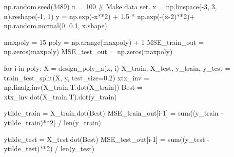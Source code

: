 \documentclass[
  letterpaper,
  DIV=11,
  numbers=noendperiod]{scrartcl}
\newenvironment{Shaded}{\begin{snugshade}}{\end{snugshade}}
\newcommand{\BuiltInTok}[1]{\textcolor[rgb]{0.00,0.23,0.31}{#1}}
\newcommand{\CommentTok}[1]{\textcolor[rgb]{0.37,0.37,0.37}{#1}}
\newcommand{\ControlFlowTok}[1]{\textcolor[rgb]{0.00,0.23,0.31}{#1}}
\newcommand{\DecValTok}[1]{\textcolor[rgb]{0.68,0.00,0.00}{#1}}
\newcommand{\FloatTok}[1]{\textcolor[rgb]{0.68,0.00,0.00}{#1}}
\newcommand{\KeywordTok}[1]{\textcolor[rgb]{0.00,0.23,0.31}{#1}}
\newcommand{\NormalTok}[1]{\textcolor[rgb]{0.00,0.23,0.31}{#1}}
\newcommand{\OperatorTok}[1]{\textcolor[rgb]{0.37,0.37,0.37}{#1}}
\begin{document}
\begin{Shaded}
\begin{Highlighting}[]
\NormalTok{np.random.seed(}\DecValTok{3489}\NormalTok{)}
\NormalTok{n }\OperatorTok{=} \DecValTok{100}
\CommentTok{\# Make data set.}
\NormalTok{x }\OperatorTok{=}\NormalTok{ np.linspace(}\OperatorTok{{-}}\DecValTok{3}\NormalTok{, }\DecValTok{3}\NormalTok{, n).reshape(}\OperatorTok{{-}}\DecValTok{1}\NormalTok{, }\DecValTok{1}\NormalTok{)}
\NormalTok{y }\OperatorTok{=}\NormalTok{ np.exp(}\OperatorTok{{-}}\NormalTok{x}\OperatorTok{**}\DecValTok{2}\NormalTok{) }\OperatorTok{+} \FloatTok{1.5} \OperatorTok{*}\NormalTok{ np.exp(}\OperatorTok{{-}}\NormalTok{(x}\OperatorTok{{-}}\DecValTok{2}\NormalTok{)}\OperatorTok{**}\DecValTok{2}\NormalTok{)}\OperatorTok{+}\NormalTok{ np.random.normal(}\DecValTok{0}\NormalTok{, }\FloatTok{0.1}\NormalTok{, x.shape)}

\NormalTok{maxpoly }\OperatorTok{=} \DecValTok{15}
\NormalTok{poly }\OperatorTok{=}\NormalTok{ np.arange(maxpoly) }\OperatorTok{+} \DecValTok{1}
\NormalTok{MSE\_train\_out }\OperatorTok{=}\NormalTok{ np.zeros(maxpoly)}
\NormalTok{MSE\_test\_out }\OperatorTok{=}\NormalTok{ np.zeros(maxpoly)}

\ControlFlowTok{for}\NormalTok{ i }\KeywordTok{in}\NormalTok{ poly:}
\NormalTok{    X }\OperatorTok{=}\NormalTok{ design\_poly\_n(x, i)}
\NormalTok{    X\_train, X\_test, y\_train, y\_test }\OperatorTok{=}\NormalTok{ train\_test\_split(X, y, test\_size}\OperatorTok{=}\FloatTok{0.2}\NormalTok{)}
\NormalTok{    xtx\_inv }\OperatorTok{=}\NormalTok{ np.linalg.inv(X\_train.T.dot(X\_train))}
\NormalTok{    Best }\OperatorTok{=}\NormalTok{ xtx\_inv.dot(X\_train.T).dot(y\_train)}
    
\NormalTok{    ytilde\_train }\OperatorTok{=}\NormalTok{ X\_train.dot(Best)}
\NormalTok{    MSE\_train\_out[i}\OperatorTok{{-}}\DecValTok{1}\NormalTok{] }\OperatorTok{=} \BuiltInTok{sum}\NormalTok{((y\_train }\OperatorTok{{-}}\NormalTok{ ytilde\_train)}\OperatorTok{**}\DecValTok{2}\NormalTok{) }\OperatorTok{/} \BuiltInTok{len}\NormalTok{(y\_train)}
    
\NormalTok{    ytilde\_test }\OperatorTok{=}\NormalTok{ X\_test.dot(Best)}
\NormalTok{    MSE\_test\_out[i}\OperatorTok{{-}}\DecValTok{1}\NormalTok{] }\OperatorTok{=} \BuiltInTok{sum}\NormalTok{((y\_test }\OperatorTok{{-}}\NormalTok{ ytilde\_test)}\OperatorTok{**}\DecValTok{2}\NormalTok{) }\OperatorTok{/} \BuiltInTok{len}\NormalTok{(y\_test)}
\end{Highlighting}
\end{Shaded}
\end{document}
